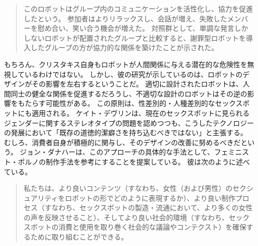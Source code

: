 \documentclass[paper=a4,book,openany]{jlreq}
\begin{document}
\begin{quote}
このロボットはグループ内のコミュニケーションを活性化し、協力を促進したという。
参加者はよりリラックスし、会話が増え、失敗したメンバーを慰め合い、笑い合う機会が増えた。
対照群として、単調な発言しかしないロボットが配置されたグループと比較すると、謝罪型ロボットを導入したグループの方が協力的な関係を築けたことが示された。
\citep{christakis19:_how_ai_will_rewir_us}
\end{quote}

もちろん、クリスタキス自身もロボットが人間関係に与える潜在的な危険性を無視しているわけではない。
しかし、彼の研究が示しているのは、ロボットのデザインがその影響を左右するということだ。
適切に設計されたロボットは、人間同士の健全な関係を促進するだろうし、不適切な設計のロボットはその逆の影響をもたらす可能性がある。
この原則は、性差別的・人種差別的なセックスボットにも適用される。
ケイト・デヴリンは、現在のセックスボットに見られるジェンダーに関するステレオタイプの問題を認めつつも、こうしたテクノロジーの発展において「既存の道徳的潔癖さを持ち込むべきではない」と主張する。
むしろ、消費者自身が積極的に関与し、そのデザインの改善に努めるべきだという\citep{devlin15:_in_defen_sex_machin}。
ジョン・ダナハーは、このアプローチの具体的な手法として、フェミニスト・ポルノの制作手法を参考にすることを提案している。
彼は次のように述べている。

\begin{quote}
私たちは、より良いコンテンツ（すなわち、女性（および男性）のセクシュアリティをロボットの形でどのように表現するか）、より良い制作プロセス（すなわち、セックスボットの製造・流通において、より多くの女性の声を反映させること）、そしてより良い社会的環境（すなわち、セックスボットの消費と使用を取り巻く社会的な議論やコンテクスト）を確保するために取り組むことができる。
\citep[p.143]{danaher19:_build_better_sex_robot}
\end{quote}
\end{document}
